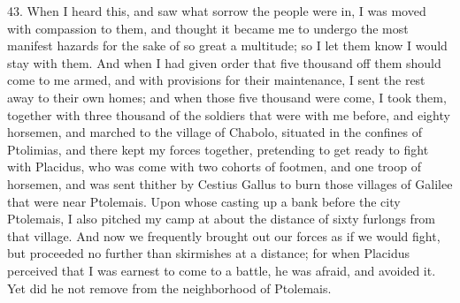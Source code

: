 43. When I heard this, and saw what sorrow the people were in, I was moved
with compassion to them, and thought it became me to undergo the most
manifest hazards for the sake of so great a multitude; so I let them know
I would stay with them. And when I had given order that five thousand off
them should come to me armed, and with provisions for their maintenance, I
sent the rest away to their own homes; and when those five thousand were
come, I took them, together with three thousand of the soldiers that were
with me before, and eighty horsemen, and marched to the village of
Chabolo, situated in the confines of Ptolimias, and there kept my forces
together, pretending to get ready to fight with Placidus, who was come
with two cohorts of footmen, and one troop of horsemen, and was sent
thither by Cestius Gallus to burn those villages of Galilee that were near
Ptolemais. Upon whose casting up a bank before the city Ptolemais, I also
pitched my camp at about the distance of sixty furlongs from that village.
And now we frequently brought out our forces as if we would fight, but
proceeded no further than skirmishes at a distance; for when Placidus
perceived that I was earnest to come to a battle, he was afraid, and
avoided it. Yet did he not remove from the neighborhood of Ptolemais.

